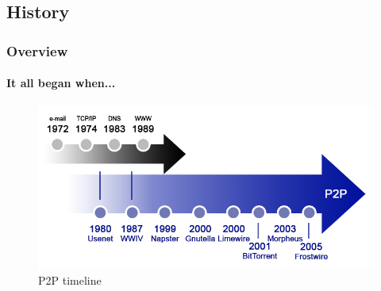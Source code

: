   \subsection{History}
    \begin{frame}
      \frametitle{Overview}
      \framesubtitle{It all began when...}
      \begin{figure}
        \centering
        \includegraphics[scale=1.5]{img/P1-time.png}
        \caption{P2P timeline}
      \end{figure}
    \end{frame}
    
